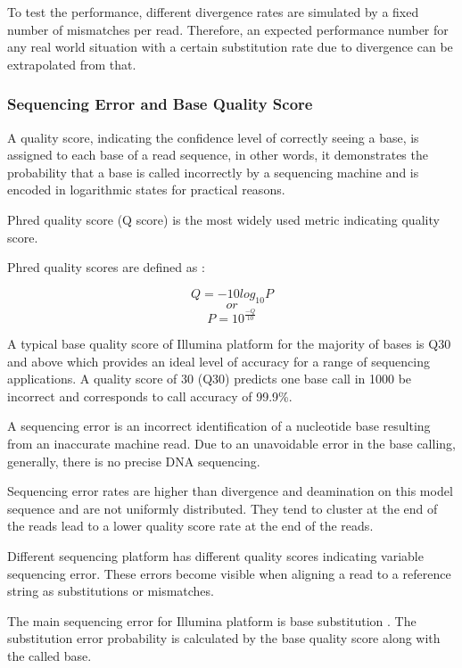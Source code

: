 \documentclass[11pt,a4paper]{report}
\begin{document}
To test the performance, different divergence rates are simulated by 
a fixed number of mismatches per read. Therefore, an expected performance 
number for any real world situation with a certain substitution rate due to 
divergence can be extrapolated from that.
 
 

\subsubsection{Sequencing Error and Base Quality Score} 
\label{Sequencing Error and Base Quality Score}
 

A quality score, indicating the confidence level of correctly seeing a 
base, is assigned to each base of a read sequence, in other words, it 
demonstrates the probability that a base is called incorrectly by a 
sequencing machine and is encoded in logarithmic states for practical 
reasons.

Phred quality score (Q score) is the most widely used metric
indicating quality score.


Phred quality scores are defined as \cite{phred2}:

$$ Q = -10  log_{10}P   $$
$$  or $$
$$ P = 10 ^ { \frac{-Q}{ 10 } } $$


A typical base quality score of Illumina platform for the majority of 
bases is Q30 and above which provides an ideal level of accuracy for a 
range of sequencing applications. 
A quality score of 30 (Q30) predicts one base call in 1000 be incorrect
and corresponds to call accuracy of 99.9\%.

A sequencing error is an incorrect identification of a nucleotide base 
resulting from an inaccurate machine read. Due to an unavoidable error 
in the base calling, generally, there is no precise DNA sequencing. 

Sequencing error rates are higher than divergence and deamination
on this model sequence and are not uniformly distributed. They tend to 
cluster at the end of the reads lead to a lower quality score rate at 
the end of the reads.

Different sequencing platform has different quality scores indicating 
variable sequencing error. These errors become visible when aligning a 
read to a reference string as substitutions or mismatches.

The main sequencing error for Illumina platform is base substitution 
\cite{art}. The substitution error probability is calculated by the 
base quality score along with the called base.
\end{document}
